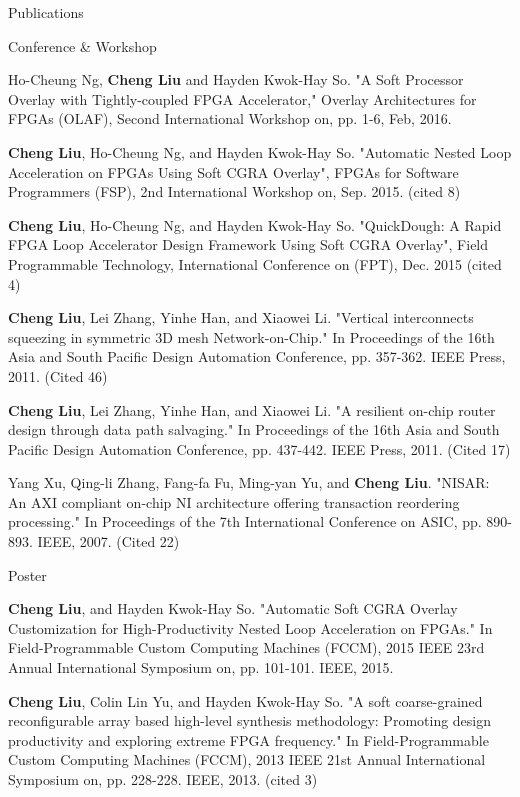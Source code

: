 \documentclass{resume} %
\begin{document}
\begin{rSection}{Publications}
    \begin{rSubsection} {Conference \& Workshop}{}{}{}
    \item Ho-Cheung Ng, \textbf{Cheng Liu} and Hayden Kwok-Hay So. "A Soft Processor Overlay with
        Tightly-coupled FPGA Accelerator," Overlay Architectures for FPGAs (OLAF), Second
        International Workshop on, pp. 1-6, Feb, 2016. 
    \item \textbf{Cheng Liu}, Ho-Cheung Ng, and Hayden Kwok-Hay So. "Automatic Nested Loop Acceleration on
        FPGAs Using Soft CGRA Overlay", FPGAs for Software Programmers (FSP), 2nd International
        Workshop on, Sep. 2015. (cited 8)
    \item \textbf{Cheng Liu}, Ho-Cheung Ng, and Hayden Kwok-Hay So. "QuickDough: A Rapid FPGA Loop
        Accelerator Design Framework Using Soft CGRA Overlay", Field Programmable Technology,
        International Conference on (FPT), Dec. 2015 (cited 4) 
    \item \textbf{Cheng Liu}, Lei Zhang, Yinhe Han, and Xiaowei Li. "Vertical interconnects squeezing in
        symmetric 3D mesh Network-on-Chip." In Proceedings of the 16th Asia and South Pacific Design
        Automation Conference, pp. 357-362. IEEE Press, 2011. (Cited 46)
    \item \textbf{Cheng Liu}, Lei Zhang, Yinhe Han, and Xiaowei Li. "A resilient on-chip router design
        through data path salvaging." In Proceedings of the 16th Asia and South Pacific Design
        Automation Conference, pp. 437-442. IEEE Press, 2011. (Cited 17)
    \item Yang Xu, Qing-li Zhang, Fang-fa Fu, Ming-yan Yu, and \textbf{Cheng Liu}. "NISAR: An AXI compliant
        on-chip NI architecture offering transaction reordering processing." In Proceedings of the
        7th International Conference on ASIC, pp. 890-893. IEEE, 2007. (Cited 22)
    \end{rSubsection}

    \begin{rSubsection} {Poster}{}{}{}
    \item \textbf{Cheng Liu}, and Hayden Kwok-Hay So. "Automatic Soft CGRA Overlay Customization for
        High-Productivity Nested Loop Acceleration on FPGAs." In Field-Programmable Custom Computing
        Machines (FCCM), 2015 IEEE 23rd Annual International Symposium on, pp. 101-101. IEEE, 2015.
    \item \textbf{Cheng Liu}, Colin Lin Yu, and Hayden Kwok-Hay So. "A soft coarse-grained reconfigurable
        array based high-level synthesis methodology: Promoting design productivity and exploring
        extreme FPGA frequency." In Field-Programmable Custom Computing Machines (FCCM), 2013 IEEE
        21st Annual International Symposium on, pp. 228-228. IEEE, 2013. (cited 3)
    \end{rSubsection}


\end{rSection}
\end{document}
